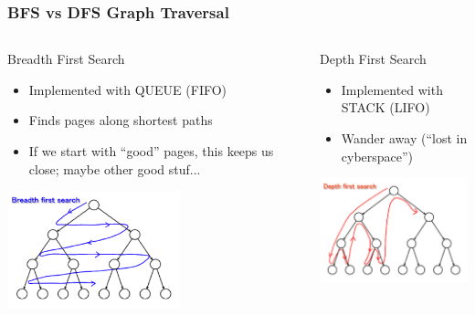 \documentclass{beamer}
\begin{document}
\begin{frame} \frametitle{BFS vs DFS Graph Traversal}
 
\begin{columns}[T]
    \begin{column}{0.5\textwidth}

Breadth First Search

    \begin{itemize} 
    \item Implemented with QUEUE (FIFO) 
    \item Finds pages along shortest paths
    \item If we start with ``good'' pages, this keeps us close; maybe
      other good stuf...
     \end{itemize}

 \includegraphics[width=5cm]{BFS}

    \end{column}
    \begin{column}{0.5\textwidth}


Depth First Search

    \begin{itemize} 
    \item Implemented with STACK (LIFO)
    \item Wander away (``lost in cyberspace'')
      \end{itemize}

 \includegraphics[width=5cm]{DFS}


   \end{column}
   
\end{columns}


\end{frame}
\end{document}
